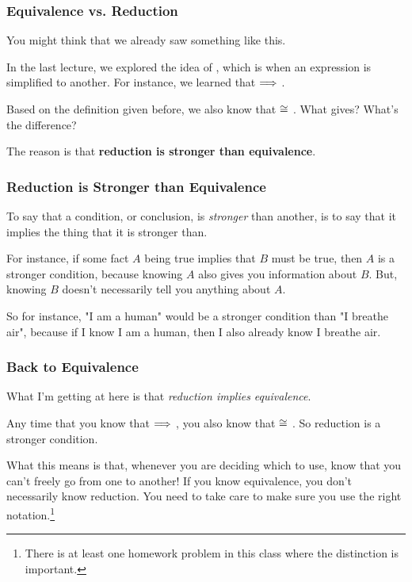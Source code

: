 \documentclass[aspectratio=169, handout]{beamer}
\begin{document}
\begin{frame}[fragile]
  \frametitle{Equivalence vs. Reduction}

  You might think that we already saw something like this.

  \pause
  \vspace{\fill}

  In the last lecture, we explored the idea of , which
  is when an expression is simplified to another. For instance, we learned
  that  $\Longrightarrow$ .

  \pause
  \vspace{\fill}

  Based on the definition given before, we also know that  $\cong$
  . What gives? What's the difference?

  \pause
  \vspace{\fill}

  The reason is that \textbf{reduction is stronger than equivalence}.
\end{frame}

\begin{frame}[fragile]
  \frametitle{Reduction is Stronger than Equivalence}

  To say that a condition, or conclusion, is \textit{stronger} than
  another, is to say that it implies the thing that it is stronger than.

  \pause
  \vspace{\fill}

  For instance, if some fact $A$ being true implies that $B$ must be true,
  then $A$ is a stronger condition, because knowing $A$ also gives you
  information about $B$. But, knowing $B$ doesn't necessarily tell you
  anything about $A$.

  \pause
  \vspace{\fill}

  So for instance, "I am a human" would be a stronger condition than
  "I breathe air", because if I know I am a human, then I also already
  know I breathe air.
\end{frame}

\begin{frame}[fragile]
  \frametitle{Back to Equivalence}

  What I'm getting at here is that \textit{reduction implies equivalence}.

  \pause
  \vspace{\fill}

  Any time that you know that  $\Longrightarrow$ , you also
  know that  $\cong$ . So reduction is a stronger
  condition.

  \pause
  \vspace{\fill}

  What this means is that, whenever you are deciding which to use, know
  that you can't freely go from one to another! If you know equivalence,
  you don't necessarily know reduction. You need to take care to make sure
  you use the right notation.\footnote{There is at least one homework problem in this class
  where the distinction is important.}

\end{frame}
\end{document}
